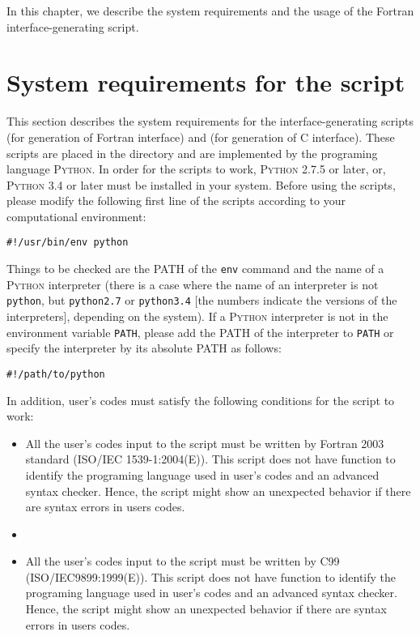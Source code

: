 In this chapter, we describe the system requirements and the usage of the Fortran interface-generating script.

\section{System requirements for the script}
This section describes the system requirements for the interface-generating scripts  (for generation of Fortran interface) and  (for generation of C interface). These scripts are placed in the directory  and are implemented by the programing language \textsc{Python}. In order for the scripts to work, \textsc{Python} 2.7.5 or later, or, \textsc{Python} 3.4 or later must be installed in your system. Before using the scripts, please modify the following first line of the scripts according to your computational environment:
\begin{Verbatim}[commandchars=\\\{\}]
#!/usr/bin/env python
\end{Verbatim}
Things to be checked are the PATH of the \texttt{env} command and the name of a \textsc{Python} interpreter (there is a case where the name of an interpreter is not \texttt{python}, but \texttt{python2.7} or \texttt{python3.4} [the numbers indicate the versions of the interpreters], depending on the system). If a \textsc{Python} interpreter is not in the environment variable \texttt{PATH}, please add the PATH of the interpreter to  \texttt{PATH} or specify the interpreter by its absolute PATH as follows:
\begin{Verbatim}[commandchars=\\\{\}]
#!/path/to/python
\end{Verbatim}

In addition, user's codes must satisfy the following conditions for the script to work:
\begin{itemize}[leftmargin=*,itemsep=-1ex]
\item All the user's codes input to the script  must be written by Fortran 2003 standard (ISO/IEC 1539-1:2004(E)). This script does not have function to identify the programing language used in user's codes and an advanced syntax checker. Hence, the script might show an unexpected behavior if there are syntax errors in users codes.
\item \item All the user's codes input to the script  must be written by C99 (ISO/IEC9899:1999(E)). This script does not have function to identify the programing language used in user's codes and an advanced syntax checker. Hence, the script might show an unexpected behavior if there are syntax errors in users codes.
\end{itemize}

